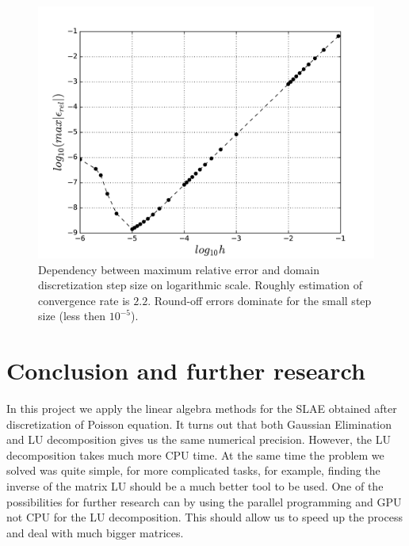 \documentclass[10pt]{article}
\begin{document}
\begin{figure}
  \begin{center}
    \includegraphics[scale=0.7]{relative_error_log}
    \caption{Dependency between maximum relative error and domain discretization step size on logarithmic scale. Roughly estimation of convergence rate is $2.2$. Round-off errors dominate for the small step size (less then $10^{-5}$).}
    \label{fig:error}
  \end{center}
\end{figure}
\newpage
\section{Conclusion and further research}
In this project we apply the linear algebra methods for the SLAE obtained after discretization of Poisson equation. It turns out that both Gaussian Elimination and LU decomposition gives us the same numerical precision. However, the LU decomposition takes much more CPU time. At the same time the problem we solved was quite simple, for more complicated tasks, for example, finding the inverse of the matrix LU should be a much better tool to be used.
One of the possibilities for further research can by using the parallel programming and GPU not CPU for the LU decomposition. This should allow us to speed up the process and deal with much bigger matrices.
\end{document}
